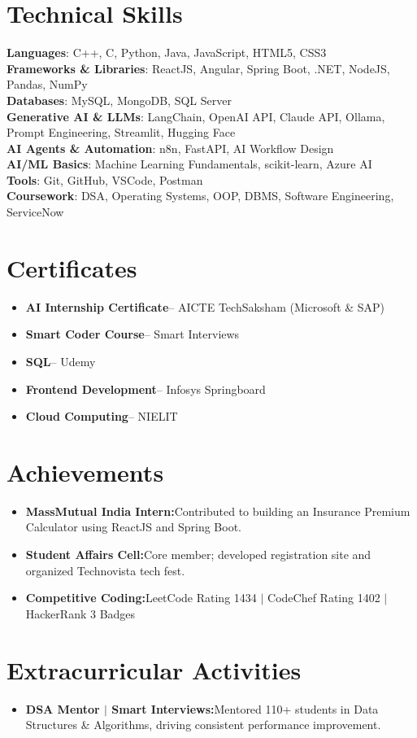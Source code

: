 \documentclass[a4paper,11pt]{article}
\newcommand{\resumeItem}[2]{
  \item{\textbf{#1}{\hspace{0.5mm}#2}}
}
\newcommand{\resumeItemListStart}{\begin{justify}\begin{itemize}[leftmargin=3ex, rightmargin=2ex, noitemsep, labelsep=1.2mm, itemsep=0mm, topsep=1pt]\small}
\newcommand{\resumeItemListEnd}{\end{itemize}\end{justify}\vspace{-2mm}}
\begin{document}
\section{\textbf{Technical Skills}}
\begin{itemize}[leftmargin=0.05in, label={}, itemsep=0.5pt, topsep=1pt]
  \small{\item{
    \textbf{Languages}{: C++, C, Python, Java, JavaScript, HTML5, CSS3} \\[0.5pt]
    \textbf{Frameworks \& Libraries}{: ReactJS, Angular, Spring Boot, .NET, NodeJS, Pandas, NumPy} \\[0.5pt]
    \textbf{Databases}{: MySQL, MongoDB, SQL Server} \\[0.5pt]
    \textbf{Generative AI \& LLMs}{: LangChain, OpenAI API, Claude API, Ollama, Prompt Engineering, Streamlit, Hugging Face} \\[0.5pt]
    \textbf{AI Agents \& Automation}{: n8n, FastAPI, AI Workflow Design} \\[0.5pt]
    \textbf{AI/ML Basics}{: Machine Learning Fundamentals, scikit-learn, Azure AI} \\[0.5pt]
    \textbf{Tools}{: Git, GitHub, VSCode, Postman} \\[0.5pt]
    \textbf{Coursework}{: DSA, Operating Systems, OOP, DBMS, Software Engineering, ServiceNow}
  }}
\end{itemize}
\vspace{-5mm}

\section{\textbf{Certificates}}
\resumeItemListStart
  \resumeItem{AI Internship Certificate}{-- AICTE TechSaksham (Microsoft \& SAP)}
  \resumeItem{Smart Coder Course}{-- Smart Interviews}
  \resumeItem{SQL}{-- Udemy}
  \resumeItem{Frontend Development}{-- Infosys Springboard}
  \resumeItem{Cloud Computing}{-- NIELIT}
\resumeItemListEnd
\vspace{-3mm}

\section{\textbf{Achievements}}
\resumeItemListStart
  \resumeItem{MassMutual India Intern:}{Contributed to building an Insurance Premium Calculator using ReactJS and Spring Boot.}
  \resumeItem{Student Affairs Cell:}{Core member; developed registration site and organized Technovista tech fest.}
  \resumeItem{Competitive Coding:}{LeetCode Rating 1434 $|$ CodeChef Rating 1402 $|$ HackerRank 3 Badges}
\resumeItemListEnd
\vspace{-3mm}

\section{\textbf{Extracurricular Activities}}
\resumeItemListStart
  \resumeItem{DSA Mentor $|$ Smart Interviews:}{Mentored 110+ students in Data Structures \& Algorithms, driving consistent performance improvement.}
\resumeItemListEnd
\end{document}
